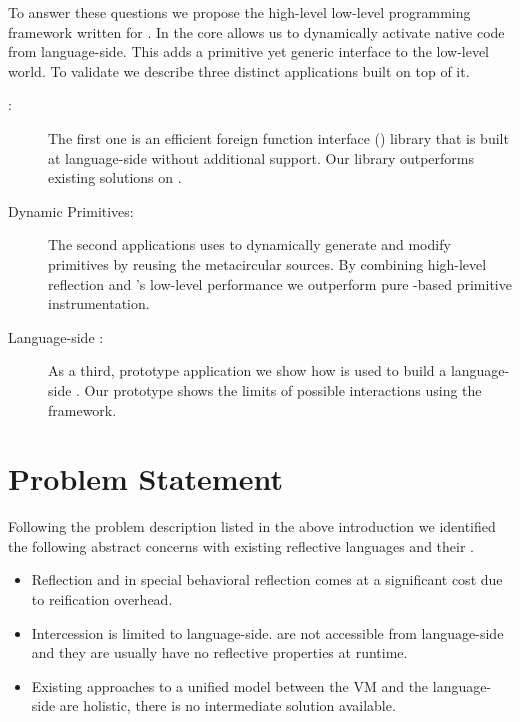 To answer these questions we propose the high-level low-level programming framework \B written for \PH.
In the core \B allows us to dynamically activate native code from language-side.
This adds a primitive yet generic interface to the low-level \VM world.
To validate \B we describe three distinct applications built on top of it.
%
\begin{description}
	\item[\FFI:] The first one is an efficient foreign function interface (\FFI) library that is built at language-side without additional \VM support.
	Our \FFI library outperforms existing solutions on \PH.
	
	\item[Dynamic Primitives:] The second applications uses \B to dynamically generate and modify \PH primitives by reusing the metacircular \VM sources.
	By combining high-level reflection and \B's low-level performance we outperform pure \PH-based primitive instrumentation.
	
	\item[Language-side \JIT:] As a third, prototype application we show how \B is used to build a language-side \JIT.
	Our prototype shows the limits of possible \VM interactions using the \B framework. 
\end{description}


\section{Problem Statement}
Following the problem description listed in the above introduction we identified the following abstract concerns with existing reflective languages and their \VMs.
%
\begin{itemize}
	\item Reflection and in special behavioral reflection comes at a significant cost due to reification overhead.
		
	\item Intercession is limited to language-side.
	\VMs are not accessible from language-side and they are usually have no reflective properties at runtime. 
	
	\item Existing approaches to a unified model between the VM and the language-side are holistic, there is no intermediate solution available.
\end{itemize}

